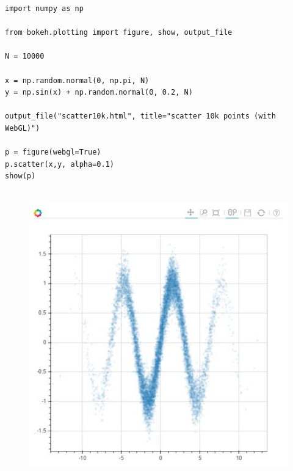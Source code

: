 \documentclass[a4paper,12pt]{article}
\begin{document}
\newpage
\begin{framed}
	\begin{verbatim}
import numpy as np

from bokeh.plotting import figure, show, output_file

N = 10000

x = np.random.normal(0, np.pi, N)
y = np.sin(x) + np.random.normal(0, 0.2, N)

output_file("scatter10k.html", title="scatter 10k points (with WebGL)")

p = figure(webgl=True)
p.scatter(x,y, alpha=0.1)
show(p)
	
\end{verbatim}
\end{framed}
\begin{figure}
\centering
\includegraphics[width=0.7\linewidth]{images/06-WebGL-02}
\end{figure}
\end{document}
